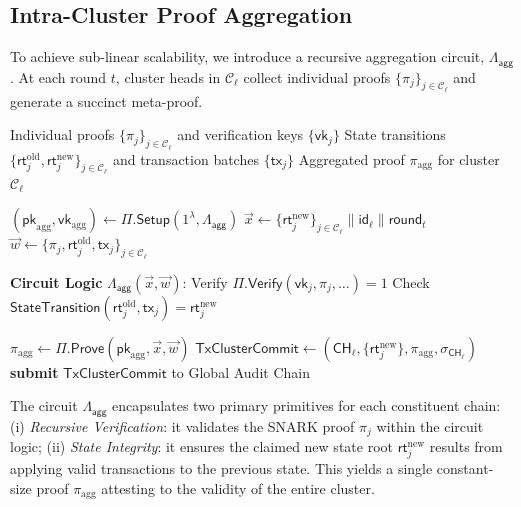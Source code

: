 \documentclass[journal]{IEEEtran}
\newcommand{\aggCircuit}{\Lambda_{\mathsf{agg}}}
\newcommand{\vk}{\mathsf{vk}}
\newcommand{\pk}{\mathsf{pk}}
\newcommand{\rootOld}{\mathsf{rt}_{j}^{\text{old}}}
\newcommand{\rootNew}{\mathsf{rt}_{j}^{\text{new}}}
\begin{document}
\subsection{Intra-Cluster Proof Aggregation}

To achieve sub-linear scalability, we introduce a recursive aggregation circuit, $\aggCircuit$. At each round $t$, cluster heads in $\mathcal{C}_\ell$ collect individual proofs $\{\pi_j\}_{j \in \mathcal{C}_\ell}$ and generate a succinct meta-proof.

\begin{algorithm}[ht]
\caption{Intra-Cluster Proof Aggregation}
\label{alg:aggregation}
\begin{algorithmic}[1]
\Require 
    \Statex Individual proofs $\{\pi_j\}_{j \in \mathcal{C}_\ell}$ and verification keys $\{\vk_j\}$
    \Statex State transitions $\{\rootOld, \rootNew\}_{j \in \mathcal{C}_\ell}$ and transaction batches $\{\mathsf{tx}_j\}$
\Ensure 
    \Statex Aggregated proof $\pi_{\text{agg}}$ for cluster $\mathcal{C}_\ell$

\State $(\pk_{\text{agg}}, \vk_{\text{agg}}) \gets \Pi.\mathsf{Setup}(1^\lambda, \aggCircuit)$ 
\State $\vec{x} \gets \{ \rootNew \}_{j \in \mathcal{C}_\ell} \parallel \mathsf{id}_\ell \parallel \mathsf{round}_t$ 
\State $\vec{w} \gets \{ \pi_j, \rootOld, \mathsf{tx}_j \}_{j \in \mathcal{C}_\ell}$ 

 \label{alg:loop}
    \State \textbf{Circuit Logic} $\aggCircuit(\vec{x}, \vec{w})$:
    \State \quad Verify $\Pi.\mathsf{Verify}(\vk_j, \pi_j, \dots) = 1$ 
    \State \quad Check $\mathsf{StateTransition}(\rootOld, \mathsf{tx}_j) = \rootNew$
\EndFor

\State $\pi_{\text{agg}} \gets \Pi.\mathsf{Prove}(\pk_{\text{agg}}, \vec{x}, \vec{w})$
\State $\mathsf{TxClusterCommit} \gets \left( \mathsf{CH}_\ell, \{\rootNew\}, \pi_{\text{agg}}, \sigma_{\mathsf{CH}_\ell} \right)$
\State \textbf{submit} $\mathsf{TxClusterCommit}$ to Global Audit Chain
\end{algorithmic}
\end{algorithm}

The circuit $\aggCircuit$ encapsulates two primary primitives for each constituent chain: 
(i) \textit{Recursive Verification}: it validates the SNARK proof $\pi_j$ within the circuit logic; 
(ii) \textit{State Integrity}: it ensures the claimed new state root $\rootNew$ results from applying valid transactions to the previous state. This yields a single constant-size proof $\pi_{\text{agg}}$ attesting to the validity of the entire cluster.
\end{document}
